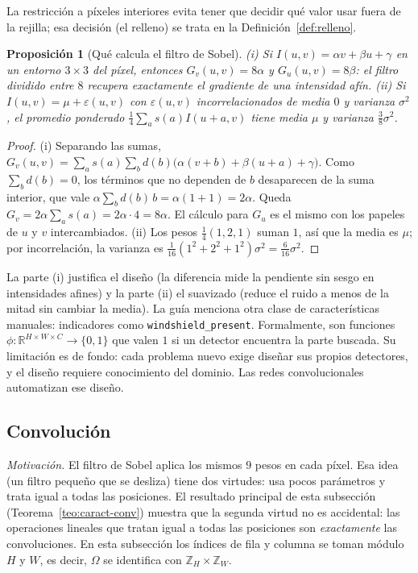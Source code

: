 \documentclass[11pt]{article}
\newtheorem{proposicion}[teorema]{Proposición}
\theoremstyle{definition}
\theoremstyle{remark}
\newcommand{\R}{\mathbb{R}}
\begin{document}
\noindent La restricción a píxeles interiores evita tener que decidir qué valor usar fuera de la rejilla; esa decisión (el relleno) se trata en la Definición~\ref{def:relleno}.

\begin{proposicion}[Qué calcula el filtro de Sobel]\label{prop:sobel}
\noindent (i) Si $I(u,v)=\alpha v+\beta u+\gamma$ en un entorno $3\times3$ del píxel, entonces $G_v(u,v)=8\alpha$ y $G_u(u,v)=8\beta$: el filtro dividido entre $8$ recupera exactamente el gradiente de una intensidad afín. (ii) Si $I(u,v)=\mu+\varepsilon(u,v)$ con $\varepsilon(u,v)$ incorrelacionados de media $0$ y varianza $\sigma^2$, el promedio ponderado $\frac14\sum_as(a)I(u+a,v)$ tiene media $\mu$ y varianza $\frac38\sigma^2$.
\end{proposicion}
\begin{proof}
\noindent (i) Separando las sumas, $G_v(u,v)=\sum_as(a)\sum_bd(b)\big(\alpha(v+b)+\beta(u+a)+\gamma\big)$. Como $\sum_bd(b)=0$, los términos que no dependen de $b$ desaparecen de la suma interior, que vale $\alpha\sum_bd(b)\,b=\alpha(1+1)=2\alpha$. Queda $G_v=2\alpha\sum_as(a)=2\alpha\cdot4=8\alpha$. El cálculo para $G_u$ es el mismo con los papeles de $u$ y $v$ intercambiados. (ii) Los pesos $\frac14(1,2,1)$ suman $1$, así que la media es $\mu$; por incorrelación, la varianza es $\frac1{16}(1^2+2^2+1^2)\sigma^2=\frac6{16}\sigma^2$.
\end{proof}

\noindent La parte (i) justifica el diseño (la diferencia mide la pendiente sin sesgo en intensidades afines) y la parte (ii) el suavizado (reduce el ruido a menos de la mitad sin cambiar la media). La guía menciona otra clase de características manuales: indicadores como \texttt{windshield\_present}. Formalmente, son funciones $\phi:\R^{H\times W\times C}\to\{0,1\}$ que valen $1$ si un detector encuentra la parte buscada. Su limitación es de fondo: cada problema nuevo exige diseñar sus propios detectores, y el diseño requiere conocimiento del dominio. Las redes convolucionales automatizan ese diseño.

\subsection{Convolución}\label{sec:conv}

\noindent \emph{Motivación.} El filtro de Sobel aplica los mismos $9$ pesos en cada píxel. Esa idea (un filtro pequeño que se desliza) tiene dos virtudes: usa pocos parámetros y trata igual a todas las posiciones. El resultado principal de esta subsección (Teorema~\ref{teo:caract-conv}) muestra que la segunda virtud no es accidental: las operaciones lineales que tratan igual a todas las posiciones son \emph{exactamente} las convoluciones. En esta subsección los índices de fila y columna se toman módulo $H$ y $W$, es decir, $\Omega$ se identifica con $\mathbb{Z}_H\times\mathbb{Z}_W$.
\end{document}
